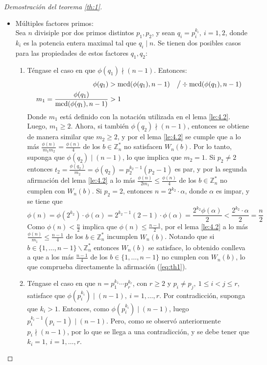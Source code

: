\documentclass[hidelinks, 12pt]{article}
\newcommand{\Zs}{\mathbb{Z}^*}
\DeclareMathOperator{\mcd}{mcd}
\begin{document}
\begin{proof}[Demostración del teorema \ref{th:1}]
\begin{itemize}
        \item Múltiples factores primos: \\
        Sea $n$ divisiple por dos primos distintos $p_1,p_2$, y sean $q_i=p_i^{k_i},~i=1,2$, donde $k_i$ es la potencia entera maximal tal que $q_i\mid n$. Se tienen dos posibles casos para las propiedades de estos factores $q_1,q_2$:
        \begin{enumerate}
            \item Téngase el caso en que $\phi(q_1)\nmid(n-1)$. Entonces:
            \begin{align*}
                \phi(q_1)&>\mcd(\phi(q_1),n-1)&&\big{/}\div\mcd(\phi(q_1),n-1) \\
                m_1=\frac{\phi(q_1)}{\mcd(\phi(q_1),n-1)}&>1
            \end{align*}
            Donde $m_1$ está definido con la notación utilizada en el lema \ref{le:4.2}. Luego, $m_1\geq 2$. Ahora, si también $\phi(q_2)\nmid(n-1)$, entonces se obtiene de manera similar que $m_2\geq 2$, y por el lema \ref{le:4.2} se cumple que a lo más $\frac{\phi(n)}{m_1m_2}=\frac{\phi(n)}{4}$ de los $b\in\Zs_n$ no satisfacen $W_n(b)$. Por lo tanto, suponga que $\phi(q_2)\mid(n-1)$, lo que implica que $m_2=1$. Si $p_2\neq 2$ entonces $t_2=\frac{\phi(q_2)}{m_2}=\phi(q_2)=p_2^{k_2-1}(p_2-1)$ es par, y por la segunda afirmación del lema \ref{le:4.2} a lo más $\frac{\phi(n)}{2m_1}\leq\frac{\phi(n)}{4}$ de los $b\in\Zs_n$ no cumplen con $W_n(b)$. Si $p_2=2$, entonces $n=2^{k_2}\cdot\alpha$, donde $\alpha$ es impar, y se tiene que
            \[\phi(n)=\phi(2^{k_2})\cdot\phi(\alpha)=2^{k_2-1}(2-1)\cdot\phi(\alpha)=\frac{2^{k_2}\phi(\alpha)}{2}<\frac{2^{k_2}\cdot\alpha}{2}=\frac{n}{2}\]
            Como $\phi(n)<\frac{n}{2}$ implica que $\phi(n)\leq\frac{n-1}{2}$, por el lema \ref{le:4.2} a lo más $\frac{\phi(n)}{m_1}\leq\frac{n-1}{4}$ de los $b\in\Zs_n$ incumplen $W_n(b)$. Notando que si $b\in\{1,\dots,n-1\}\backslash\Zs_n$ entonces $W_n(b)$ se satisface, lo obtenido conlleva a que a los más $\frac{n-1}{4}$ de los $b\in\{1,\dots,n-1\}$ no cumplen con $W_n(b)$, lo que comprueba directamente la afirmación (\ref{eq:th1}).

            \item Téngase el caso en que $n=p_1^{k_1}\dotsm p_r^{k_r}$, con $r\geq 2$ y $p_i\neq p_j,~1\leq i<j\leq r$, satisface que $\phi(p_i^{k_i})\mid(n-1),~i=1,\dots,r$. Por contradicción, suponga que $k_i>1$. Entonces, como $\phi(p_i^{k_i})\mid(n-1)$, luego $p_i^{k_i-1}(p_i-1)\mid(n-1)$. Pero, como se observó anteriormente $p_i\nmid(n-1)$, por lo que se llega a una contradicción, y se debe tener que $k_i=1,~i=1,\dots,r$.


\end{enumerate}
\end{itemize}
\end{proof}
\end{document}
